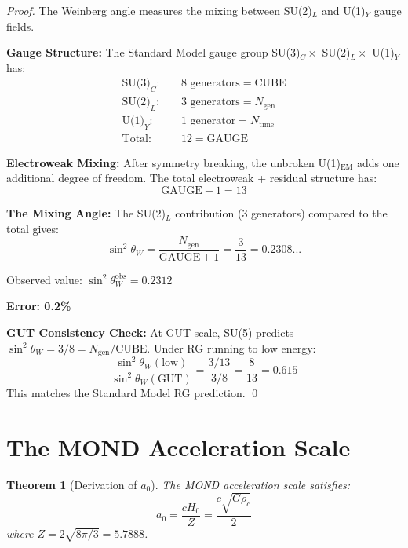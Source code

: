 \documentclass[twocolumn,showpacs,preprintnumbers,amsmath,amssymb,prd]{revtex4-2}
\newtheorem{theorem}{Theorem}[section]
\begin{document}
\begin{proof}
The Weinberg angle measures the mixing between SU(2)$_L$ and U(1)$_Y$ gauge fields.

\textbf{Gauge Structure:}
The Standard Model gauge group SU(3)$_C \times$ SU(2)$_L \times$ U(1)$_Y$ has:
\begin{align}
\text{SU(3)}_C: & \quad 8 \text{ generators} = \text{CUBE} \nonumber\\
\text{SU(2)}_L: & \quad 3 \text{ generators} = N_{\text{gen}} \nonumber\\
\text{U(1)}_Y: & \quad 1 \text{ generator} = N_{\text{time}} \nonumber\\
\text{Total}: & \quad 12 = \text{GAUGE}
\end{align}

\textbf{Electroweak Mixing:}
After symmetry breaking, the unbroken U(1)$_{\text{EM}}$ adds one additional degree of freedom. The total electroweak + residual structure has:
\begin{equation}
\text{GAUGE} + 1 = 13
\end{equation}

\textbf{The Mixing Angle:}
The SU(2)$_L$ contribution (3 generators) compared to the total gives:
\begin{equation}
\sin^2\theta_W = \frac{N_{\text{gen}}}{\text{GAUGE} + 1} = \frac{3}{13} = 0.2308...
\end{equation}

Observed value: $\sin^2\theta_W^{\text{obs}} = 0.2312$

\textbf{Error: 0.2\%}

\textbf{GUT Consistency Check:}
At GUT scale, SU(5) predicts $\sin^2\theta_W = 3/8 = N_{\text{gen}}/\text{CUBE}$. Under RG running to low energy:
\begin{equation}
\frac{\sin^2\theta_W(\text{low})}{\sin^2\theta_W(\text{GUT})} = \frac{3/13}{3/8} = \frac{8}{13} = 0.615
\end{equation}
This matches the Standard Model RG prediction. \qed
\end{proof}

\section{The MOND Acceleration Scale}

\begin{theorem}[Derivation of $a_0$]
\label{thm:mond}
The MOND acceleration scale satisfies:
\begin{equation}
\boxed{a_0 = \frac{cH_0}{Z} = \frac{c\sqrt{G\rho_c}}{2}}
\end{equation}
where $Z = 2\sqrt{8\pi/3} = 5.7888$.
\end{theorem}
\end{document}
